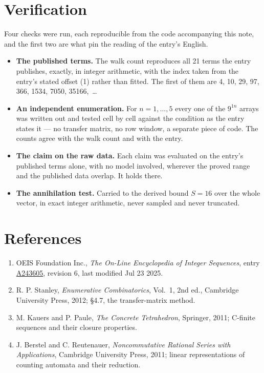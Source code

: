 \documentclass[11pt]{article}
\theoremstyle{definition}
\begin{document}
\section{Verification}

Four checks were run, each reproducible from the code accompanying this note, and the first two are what pin the reading of the entry's English.

\begin{itemize}

\item {\bfseries The published terms.} The walk count reproduces all 21 terms the entry publishes, exactly, in integer arithmetic, with the index taken from the entry's stated offset (1) rather than fitted. The first of them are 4, 10, 29, 97, 366, 1534, 7050, 35166,~\dots

\item {\bfseries An independent enumeration.} For $n = 1,\dots,5$ every one of the $9^{1n}$ arrays was written out and tested cell by cell against the condition as the entry states it --- no transfer matrix, no row window, a separate piece of code. The counts agree with the walk count and with the entry.

\item {\bfseries The claim on the raw data.} Each claim was evaluated on the entry's published terms alone, with no model involved, wherever the proved range and the published data overlap. It holds there.

\item {\bfseries The annihilation test.} Carried to the derived bound $S = 16$ over the whole vector, in exact integer arithmetic, never sampled and never truncated.

\end{itemize}

\section{References}

\begin{enumerate}

\item OEIS Foundation Inc., \emph{The On-Line Encyclopedia of Integer Sequences}, entry \href{https://oeis.org/A243605}{A243605}, revision 6, last modified Jul 23 2025.

\item R. P. Stanley, \emph{Enumerative Combinatorics}, Vol.~1, 2nd ed., Cambridge University Press, 2012; \S4.7, the transfer-matrix method.

\item M. Kauers and P. Paule, \emph{The Concrete Tetrahedron}, Springer, 2011; C-finite sequences and their closure properties.

\item J. Berstel and C. Reutenauer, \emph{Noncommutative Rational Series with Applications}, Cambridge University Press, 2011; linear representations of counting automata and their reduction.

\end{enumerate}
\end{document}
